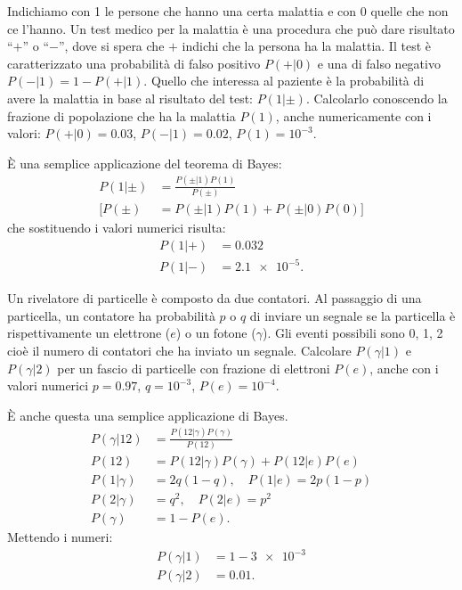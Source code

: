 
\begin{exercise}
	Indichiamo con 1 le persone che hanno una certa malattia e con 0 quelle che non ce l'hanno.
	Un test medico per la malattia è una procedura che può dare risultato ``$+$'' o ``$-$'',
	dove si spera che $+$ indichi che la persona ha la malattia.
	Il test è caratterizzato una probabilità di falso positivo $P(+|0)$ e una di falso negativo
	$P(-|1) = 1 - P(+|1)$.
	Quello che interessa al paziente è la probabilità di avere la malattia in base al risultato del test:
	$P(1|\pm)$. Calcolarlo conoscendo la frazione di popolazione che ha la malattia $P(1)$, anche numericamente con i valori: $P(+|0)=0.03$, $P(-|1)=0.02$, $P(1)=10^{-3}$.
\end{exercise}

\begin{solution}
	È una semplice applicazione del teorema di Bayes:
	\begin{align*}
		P(1|\pm) &= \frac{P(\pm|1) P(1)}{P(\pm)} \\
		\Big[ P(\pm) &= P(\pm|1)P(1) + P(\pm|0)P(0) \Big]
	\end{align*}
	che sostituendo i valori numerici risulta:
	\begin{align*}
		P(1|+) &= 0.032 \\
		P(1|-) &= \num{2.1e-5}.
	\end{align*}
\end{solution}

\begin{exercise}
	Un rivelatore di particelle è composto da due contatori.
	Al passaggio di una particella,
	un contatore ha probabilità $p$ o $q$ di inviare un segnale se la particella è rispettivamente
	un elettrone ($e$) o un fotone ($\gamma$).
	Gli eventi possibili sono 0, 1, 2 cioè il numero di contatori che ha inviato un segnale.
	Calcolare $P(\gamma|1)$ e $P(\gamma|2)$ per un fascio di particelle con frazione di elettroni $P(e)$,
	anche con i valori numerici $p=0.97$, $q=10^{-3}$, $P(e)=10^{-4}$.
\end{exercise}

\begin{solution}
	È anche questa una semplice applicazione di Bayes.
	\begin{align*}
		P(\gamma|12) &= \frac{P(12|\gamma) P(\gamma)}{P(12)} \\
		P(12) &= P(12|\gamma)P(\gamma) + P(12|e)P(e) \\
		P(1|\gamma) &= 2q(1-q), \quad P(1|e) = 2p(1-p) \\
		P(2|\gamma) &= q^2, \quad P(2|e) = p^2 \\
		P(\gamma) &= 1 - P(e).
	\end{align*}
	Mettendo i numeri:
	\begin{align*}
		P(\gamma|1) &= 1 - \num{3e-3} \\
		P(\gamma|2) &= 0.01.
	\end{align*}
\end{solution}

